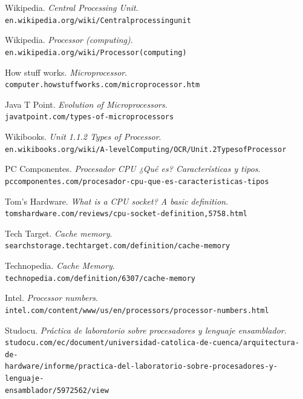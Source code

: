 \documentclass[a4paper, twoside, 11pt]{article}
\begin{document}
\begin{thebibliography}{11}
    Wikipedia. \textit{Central Processing Unit}. \\\texttt{en.wikipedia.org/wiki/Central\textunderscore processing\textunderscore unit}

    Wikipedia. \textit{Processor (computing)}. \\\texttt{en.wikipedia.org/wiki/Processor\textunderscore(computing)}

    How stuff works. \textit{Microprocessor}. \\\texttt{computer.howstuffworks.com/microprocessor.htm}

    Java T Point. \textit{Evolution of Microprocessors}. \\\texttt{javatpoint.com/types-of-microprocessors}

    Wikibooks. \textit{Unit 1.1.2 Types of Processor}. \\\texttt{en.wikibooks.org/wiki/A-level\textunderscore Computing/OCR/Unit.2\textunderscore Types\textunderscore of\textunderscore Processor}

    PC Componentes. \textit{Procesador CPU ¿Qué es? Características y tipos}. \\\texttt{pccomponentes.com/procesador-cpu-que-es-caracteristicas-tipos}

    Tom's Hardware. \textit{What is a CPU socket? A basic definition}. \\\texttt{tomshardware.com/reviews/cpu-socket-definition,5758.html}

    Tech Target. \textit{Cache memory}. \\\texttt{searchstorage.techtarget.com/definition/cache-memory}

    Technopedia. \textit{Cache Memory}. \\\texttt{technopedia.com/definition/6307/cache-memory}

    Intel. \textit{Processor numbers}. \\\texttt{intel.com/content/www/us/en/processors/processor-numbers.html}

Studocu. \textit{Práctica de laboratorio sobre procesadores y lenguaje ensamblador}. \\\texttt{studocu.com/ec/document/universidad-catolica-de-cuenca/arquitectura-de-} \\\texttt{hardware/informe/practica-del-laboratorio-sobre-procesadores-y-lenguaje-} \\\texttt{ensamblador/5972562/view}
\end{thebibliography} 
\end{document}
